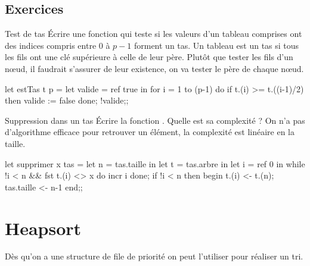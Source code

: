 \subsection{Exercices}
\begin{exo}{Test de tas}{}
Écrire une fonction  qui teste si les valeurs d'un tableau comprises ont des indices compris entre 0 à $p-1$ forment un tas.
\reponse
Un tableau est un tas si tous les fils ont une clé supérieure à celle de leur père. Plutôt que tester les fils d'un nœud, il faudrait s'assurer de leur existence, on va tester le père de chaque nœud.

\begin{ocaml}
let estTas t p =
   let valide = ref true in
      for i = 1 to (p-1) do
      if  t.(i) >= t.((i-1)/2) then valide := false done;
   !valide;;
\end{ocaml}
\end{exo}
\begin{exo}{Suppression dans un tas}{}
 Écrire la fonction . Quelle est sa complexité ?
\reponse
On n'a pas d'algorithme efficace pour retrouver un élément, la complexité est linéaire en la taille.
\begin{ocaml}
let supprimer x tas =
   let n  = tas.taille in
   let t = tas.arbre in
   let i = ref 0 in
   while !i < n && fst t.(i) <> x do  incr i done;
   if !i < n
   then begin t.(i) <- t.(n);
              tas.taille <- n-1 end;;
\end{ocaml}
\end{exo}
\section{Heapsort}
Dès qu'on a une structure de file de priorité on peut l'utiliser pour réaliser un tri.

